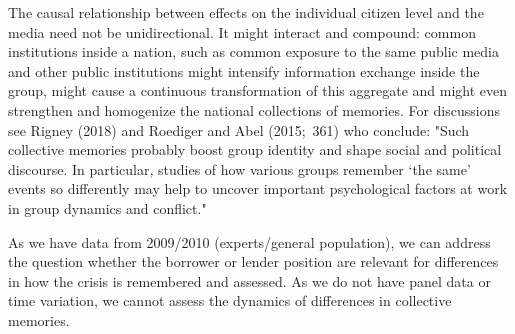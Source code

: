 The causal relationship between effects on the individual citizen level and
the media need not be unidirectional. It might interact and compound: common
institutions inside a nation, such as common exposure to the same public
media and other public institutions might intensify information exchange
inside the group, might cause a continuous transformation of this aggregate
and might even strengthen and homogenize the national collections of
memories. For discussions see Rigney (2018) and Roediger and Abel (2015;\
361) who conclude: "Such collective memories probably boost group identity
and shape social and political discourse. In particular, studies of how
various groups remember `the same' events so differently may help to uncover
important psychological factors at work in group dynamics and conflict."

As we have data from 2009/2010 (experts/general population), we can address
the question whether the borrower or lender position are relevant for
differences in how the crisis is remembered and assessed. As we do not have
panel data or time variation, we cannot assess the dynamics of
differences in collective memories.
